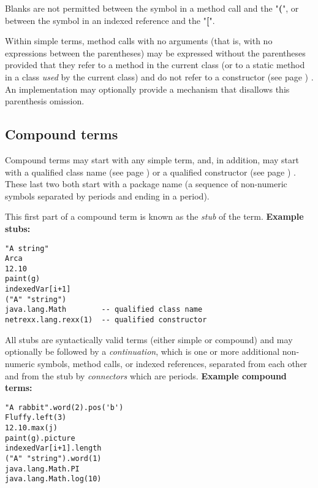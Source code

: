 Blanks are not permitted between the symbol in a method call and the
"\textbf{(}", or between the symbol in an indexed reference and
the "\textbf{[}".
 
Within simple terms, method calls with no arguments (that is, with no
expressions between the parentheses) may be expressed without the
parentheses provided that they refer to a method in the current class
(or to a static method in a class \emph{used} by the current class)
and do not refer to a  constructor (see page \pageref{refcons}) .
An implementation may optionally provide a mechanism that disallows this
parenthesis omission.
\subsection{Compound terms}\label{refcomterm}
 
Compound terms may start with any simple term, and, in addition, may
start with a  qualified class name (see page \pageref{refpackage})  or a
 qualified constructor (see page \pageref{refmethcon}) .
These last two both start with a package name (a sequence of non-numeric
symbols separated by periods and ending in a period).
 
This first part of a compound term is known as the \emph{stub} of the
term.
 \textbf{Example stubs:}
\begin{lstlisting}
"A string"
Arca
12.10
paint(g)
indexedVar[i+1]
("A" "string")
java.lang.Math        -- qualified class name
netrexx.lang.rexx(1)  -- qualified constructor
\end{lstlisting}
 
All stubs are syntactically valid terms (either simple or compound) and
may optionally be followed by a \emph{continuation}, which is one or
more additional non-numeric symbols, method calls, or indexed
references, separated from each other and from the stub by
\emph{connectors} which are periods.
 \textbf{Example compound terms:}
\begin{lstlisting}
"A rabbit".word(2).pos('b')
Fluffy.left(3)
12.10.max(j)
paint(g).picture
indexedVar[i+1].length
("A" "string").word(1)
java.lang.Math.PI
java.lang.Math.log(10)
\end{lstlisting}
 
